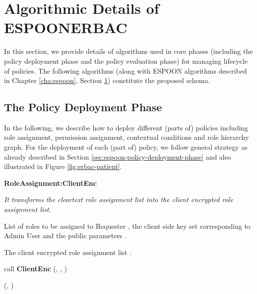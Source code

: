 \documentclass[epsfig,a4paper,11pt,titlepage]{book}
\numberwithin{algorithm}{chapter}
\newcommand{\algofontsize}{\fontsize{11}{12}\selectfont}
\begin{document}
\section[Algorithmic Details of ESPOON]{Algorithmic Details of \gls{ESPOONERBAC}}
\label{sec:erbac-algorithmic-details}
In this section, we provide details of algorithms used in core phases (including the policy deployment phase and the policy evaluation phase) for managing lifecycle of policies. The following algorithms (along with \gls{ESPOON} algorithms described in Chapter \ref{cha:espoon}, Section \ref{sec:erbac-algorithmic-details}) constitute the proposed schema. 

\subsection{The Policy Deployment Phase}
In the following, we describe how to deploy different (parts of) policies including role assignment, permission assignment, contextual conditions and role hierarchy graph. For the deployment of each (part of) policy, we follow general strategy as already described in Section \ref{sec:espoon-policy-deployment-phase} and also illustrated in Figure \ref{fig:erbac-patient}.



\begin{algorithm} [htp]
{\algofontsize
\caption{\textbf{RoleAssignment:ClientEnc}}

\label{algo:erbac-deploy-role-assignment-client-side}

\begin{algorithmic}[1]

\INPUT \emph{It transforms the cleartext role assignment list into the client encrypted role assignment list.}

\Require List of roles  to be assigned to Requester , the client side key set  corresponding to Admin User  and the public parameters .

\Ensure The client encrypted role assignment list .

\medskip

\State  \label{line:erbac-deploy-ra-cs-init}

 \label{line:erbac-deploy-ra-cs-loop}

	\State  call \textbf{ClientEnc} (, , ) {\algofontsize {}} \label{line:erbac-deploy-ra-cs-call-enc}
	
	\State  \label{line:erbac-deploy-ra-cs-update}

\EndFor

\Return (, )

\end{algorithmic}
}
\end{algorithm}
\end{document}
